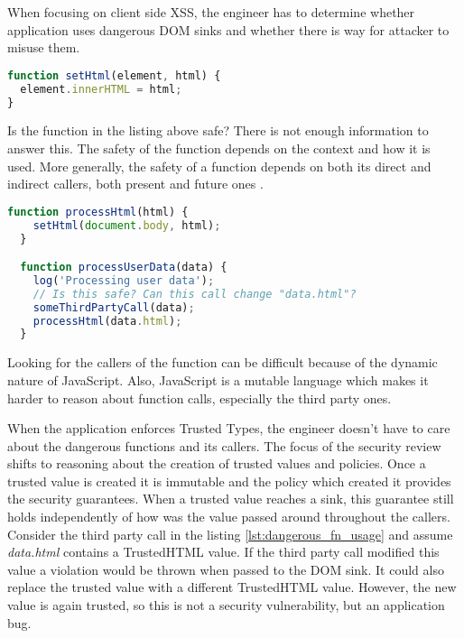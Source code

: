 When focusing on client side XSS, the engineer has to determine whether application uses dangerous
DOM sinks and whether there is way for attacker to misuse them.

\bigskip
\begin{lstlisting}[language=JavaScript, caption=Possibly dangerous function]
function setHtml(element, html) {
  element.innerHTML = html;
}
\end{lstlisting}

Is the function in the listing above safe? There is not enough information to answer this. The
safety of the function depends on the context and how it is used. More generally, the safety of a
function depends on both its direct and indirect callers, both present and future ones
\cite{tt_design_history}.

\bigskip
\begin{lstlisting}[language=JavaScript, caption=Usage of the possibly dangerous function, label={lst:dangerous_fn_usage}]
  function processHtml(html) {
    setHtml(document.body, html);
  }

  function processUserData(data) {
    log('Processing user data');
    // Is this safe? Can this call change "data.html"?
    someThirdPartyCall(data);
    processHtml(data.html);
  }
\end{lstlisting}

Looking for the callers of the function can be difficult because of the dynamic nature of
JavaScript. Also, JavaScript is a mutable language which makes it harder to reason about function
calls, especially the third party ones.

When the application enforces Trusted Types, the engineer doesn't have to care about the dangerous
functions and its callers. The focus of the security review shifts to reasoning about the creation
of trusted values and policies. Once a trusted value is created it is immutable and the policy which
created it provides the security guarantees. When a trusted value reaches a sink, this guarantee
still holds independently of how was the value passed around throughout the callers. Consider the
third party call in the listing \ref{lst:dangerous_fn_usage} and assume \textit{data.html} contains
a TrustedHTML value. If the third party call modified this value a violation would be thrown when
passed to the DOM sink. It could also replace the trusted value with a different TrustedHTML value.
However, the new value is again trusted, so this is not a security vulnerability, but an application
bug.

